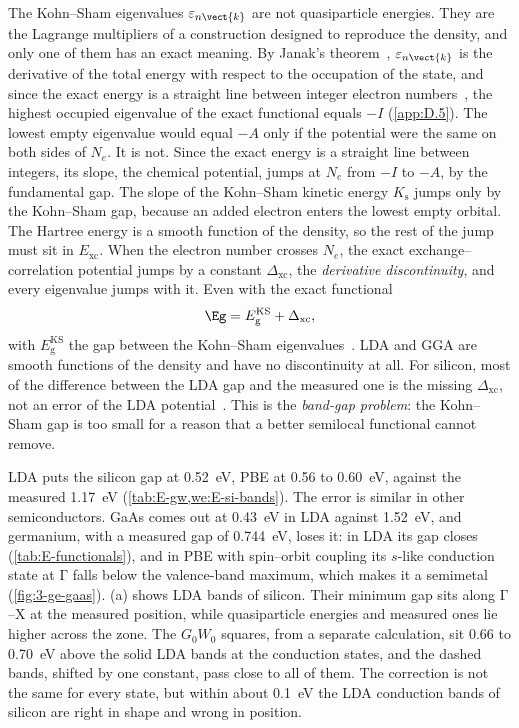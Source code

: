 The Kohn--Sham eigenvalues $\varepsilon_{n\vect{k}}$ are not quasiparticle energies. They are the Lagrange multipliers of a construction designed to reproduce the density, and only one of them has an exact meaning. By Janak's theorem~\cite{janak1978proof}, $\varepsilon_{n\vect{k}}$ is the derivative of the total energy with respect to the occupation of the state, and since the exact energy is a straight line between integer electron numbers~\cite{perdew1982density}, the highest occupied eigenvalue of the exact functional equals $-I$ (\cref{app:D.5}). The lowest empty eigenvalue would equal $-A$ only if the potential were the same on both sides of $N_e$. It is not. Since the exact energy is a straight line between integers, its slope, the chemical potential, jumps at $N_e$ from $-I$ to $-A$, by the fundamental gap. The slope of the Kohn--Sham kinetic energy $K_{\mathrm{s}}$ jumps only by the Kohn--Sham gap, because an added electron enters the lowest empty orbital. The Hartree energy is a smooth function of the density, so the rest of the jump must sit in $E_{\mathrm{xc}}$. When the electron number crosses $N_e$, the exact exchange--correlation potential jumps by a constant $\Delta_{\mathrm{xc}}$, the \emph{derivative discontinuity}, and every eigenvalue jumps with it. Even with the exact functional
\begin{equation}
  \Eg = E_{\mathrm{g}}^{\mathrm{KS}} + \Delta_{\mathrm{xc}} ,
  \label{eq:3.4-gap}
\end{equation}
with $E_{\mathrm{g}}^{\mathrm{KS}}$ the gap between the Kohn--Sham eigenvalues~\cite{perdew1983physical,sham1983density}. LDA and GGA are smooth functions of the density and have no discontinuity at all. For silicon, most of the difference between the LDA gap and the measured one is the missing $\Delta_{\mathrm{xc}}$, not an error of the LDA potential~\cite{godby1986accurate}. This is the \emph{band-gap problem}: the Kohn--Sham gap is too small for a reason that a better semilocal functional cannot remove.

LDA puts the silicon gap at \SI{0.52}{eV}, PBE at 0.56 to \SI{0.60}{eV}, against the measured \SI{1.17}{eV} (\cref{tab:E-gw,we:E-si-bands}). The error is similar in other semiconductors. GaAs comes out at \SI{0.43}{eV} in LDA against \SI{1.52}{eV}, and germanium, with a measured gap of \SI{0.744}{eV}, loses it: in LDA its gap closes (\cref{tab:E-functionals}), and in PBE with spin--orbit coupling its $s$-like conduction state at $\mathrm{\Gamma}$ falls below the valence-band maximum, which makes it a semimetal (\cref{fig:3-ge-gaas}). (a) shows LDA bands of silicon. Their minimum gap sits along $\mathrm{\Gamma}$--$\mathrm{X}$ at the measured position, while quasiparticle energies and measured ones lie higher across the zone. The $G_0W_0$ squares, from a separate calculation, sit 0.66 to \SI{0.70}{eV} above the solid LDA bands at the conduction states, and the dashed bands, shifted by one constant, pass close to all of them. The correction is not the same for every state, but within about \SI{0.1}{eV} the LDA conduction bands of silicon are right in shape and wrong in position.

